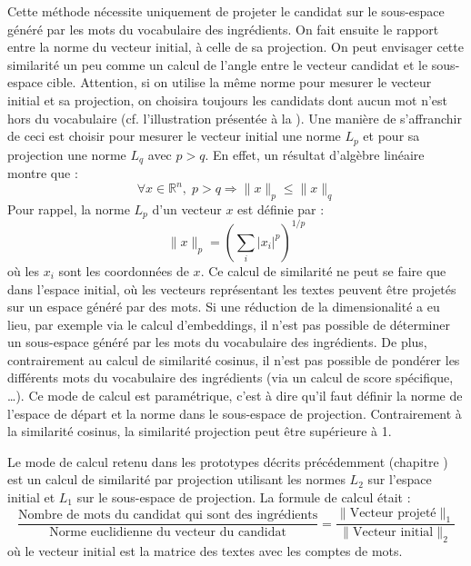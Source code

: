             Cette méthode nécessite uniquement de projeter le candidat sur le sous-espace généré par les mots du vocabulaire des ingrédients.
            On fait ensuite le rapport entre la norme du vecteur initial, à celle de sa projection. 
            On peut envisager cette similarité un peu comme un calcul de l'angle entre le vecteur candidat et le sous-espace cible.
            Attention, si on utilise la même norme pour mesurer le vecteur initial et sa projection, on choisira toujours les candidats dont aucun mot n'est hors du vocabulaire (cf. l'illustration présentée à la ).
            Une manière de s'affranchir de ceci est choisir pour mesurer le vecteur initial une norme $L_{p}$ et pour sa projection une norme $L_{q}$ avec $p > q$.
            En effet, un résultat d'algèbre linéaire~\cite{lpnorms} montre que :
            \[\forall x \in \mathbb{R}^{n}, \; p > q \Rightarrow \lVert x \rVert_{p} \leqslant \lVert x \rVert_{q}\]
            Pour rappel, la norme $L_{p}$ d'un vecteur $x$ est définie par : 
            \[\lVert x \rVert_{p} = \left( \sum_{i} |x_{i}|^{p} \right)^{1/p} \]
            où les $x_{i}$ sont les coordonnées de $x$.
            Ce calcul de similarité ne peut se faire que dans l'espace initial, où les vecteurs représentant les textes peuvent être projetés sur un espace généré par des mots.
            Si une réduction de la dimensionalité a eu lieu, par exemple via le calcul d'embeddings, il n'est pas possible de déterminer un sous-espace généré par les mots du vocabulaire des ingrédients.
            De plus, contrairement au calcul de similarité cosinus, il n'est pas possible de pondérer les différents mots du vocabulaire des ingrédients (via un calcul de score spécifique, \dots).
            Ce mode de calcul est paramétrique, c'est à dire qu'il faut définir la norme de l'espace de départ et la norme dans le sous-espace de projection.
            Contrairement à la similarité cosinus, la similarité projection peut être supérieure à 1.

            Le mode de calcul retenu dans les prototypes décrits précédemment (chapitre ) est un calcul de similarité par projection utilisant les normes $L_{2}$ sur l'espace initial et $L_{1}$ sur le sous-espace de projection.
            La formule de calcul était : 
            \[\frac{\text{Nombre de mots du candidat qui sont des ingrédients}}{\text{Norme euclidienne du vecteur du candidat}} = \frac{\lVert\text{Vecteur projeté}\rVert_{1}}{\lVert\text{Vecteur initial}\rVert_{2}}\]
            où le vecteur initial est la matrice des textes avec les comptes de mots.

